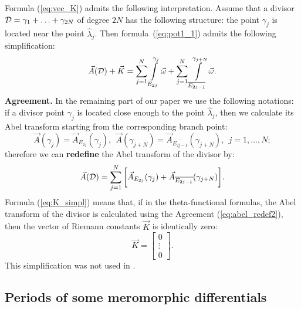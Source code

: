 \documentclass[12pt]{article}
\newcommand{\DD}{{\cal D}}
\begin{document}
Formula (\ref{eq:vec_K}) admits the following interpretation. Assume that a divisor $\DD=\gamma_1+\ldots+\gamma_{2N}$ of degree $2N$ has the following structure: the point $\gamma_j$ is located near the point $\hat\lambda_j$. Then formula~(\ref{eq:pot1_1}) admits the following simplification:
\begin{equation}
\label{eq:K_simpl}
\vec A(\DD) + \vec K = \sum\limits_{j=1}^N \int\limits_{E_{2j}}^{\gamma_j} \vec \omega+  \sum\limits_{j=1}^N \int\limits_{\overline{E_{2j-1}}}^{\gamma_{j+N}} \vec\omega. 
\end{equation}
\textbf{Agreement.} In the remaining part of our paper we use the following notations: if a divisor point $\gamma_j$ is located close enough to the point $\hat\lambda_j$, then we calculate its Abel transform starting from the corresponding branch point:
\begin{equation}
\label{eq:abel_redef}
\vec A(\gamma_j)=\vec A_{E_{2j}}(\gamma_j), \ \  \vec A(\gamma_{j+N})= \vec A_{\overline{E_{2j-1}}}(\gamma_{j+N}), \ \ j=1,\ldots,N;
\end{equation}
therefore we can \textbf{redefine} the Abel transform of the divisor by: 
\begin{equation}
\label{eq:abel_redef2}
\vec A(\DD) = \sum\limits_{j=1}^{N} \bigg[\vec A_{E_{2j}}(\gamma_j)+ \vec A_{\overline{E_{2j-1}}}(\gamma_{j+N}) \bigg].
\end{equation}
Formula (\ref{eq:K_simpl}) means that, if in the theta-functional formulas, the Abel transform of the divisor is calculated using the Agreement (\ref{eq:abel_redef2}), then the vector of Riemann constants $\vec K$ is identically zero:
\begin{equation}
\label{eq:vec_K0}
\vec K = \left[\begin{array}{c} 0 \\ \vdots \\ 0 \end{array}\right].
\end{equation}
This simplification was not used in \cite{GS1}.

\subsection{Periods of some meromorphic differentials}
\label{sec:sec5.3}
\end{document}
